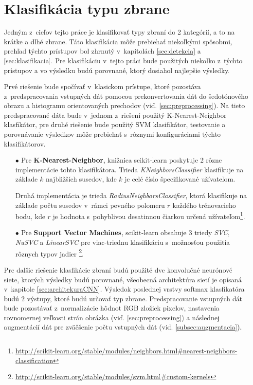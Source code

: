 
\section{Klasifikácia typu zbrane}
\label{sec:klasfikaciatypuzbrane}
Jedným z~cieľov tejto práce je klasifikovať typy zbraní do 2 kategórií, a to na krátke a dlhé zbrane.
Táto klasifikácia môže prebiehať niekoľkými spôsobmi, prehľad týchto prístupov bol zhrnutý v~kapitolách \ref{sec:detekcia} a \ref{sec:klasifikacia}.
Pre klasifikáciu v~tejto práci bude použitých niekoľko z~týchto prístupov a vo výsledku budú porovnané, ktorý dosiahol najlepšie výsledky.

Prvé riešenie bude spočívať v~klasickom prístupe, ktoré pozostáva z~predspracovania vstupných dát pomocou prekonvertovania dát do šedotónového obrazu a histogramu orientovaných prechodov (viď. \ref{sec:preprocessing}).
Na tieto predspracované dáta bude v~jednom z~riešení použitý K-Nearest-Neighbor klasfikátor, pre druhé riešenie bude použitý SVM klasifikátor, testovanie
    a porovnávanie výsledkov môže prebiehať s~rôznymi konfiguráciami týchto klasifikátorov.
\begin{enumerate}
    \item[$\bullet$] Pre \textbf{K-Nearest-Neighbor}, knižnica scikit-learn poskytuje 2 rôzne implementácie tohto klasifikátora.
    Trieda \textit{KNeighborsClassifier} klasifikuje na základe $k$ najbližších susedov, kde $k$ je celé číslo špecifikované užívateľom.
    
    Druhá implementácia je trieda \textit{RadiusNeighborsClassifier}, ktorá klasifikuje na základe počtu susedov v~rámci pevného polomeru $r$ každého trénovacieho bodu,
        kde $r$ je hodnota s~pohyblivou desatinnou čiarkou určená užívateľom\footnote{\url{http://scikit-learn.org/stable/modules/neighbors.html\#nearest-neighbors-classification}}.
    \item[$\bullet$] Pre \textbf{Support Vector Machines}, scikit-learn obsahuje 3 triedy \textit{SVC}, \textit{NuSVC} a \textit{LinearSVC} pre viac-triednu
        klasifikáciu s~možnosťou použitia rôznych typov jadier \footnote{\url{http://scikit-learn.org/stable/modules/svm.html\#custom-kernels}}.
\end{enumerate}

Pre dalšie riešenie klasfikácie zbraní budú použité dve konvolučné neurónové siete, ktorých výsledky budú porovnané, všeobecná architektúra sietí je opísaná v~kapitole \ref{sec:architekuraCNN}.
Výsledok poslednej vrstvy softmax klasfikatóra budú 2 výstupy, ktoré budú určovať typ zbrane.
Predspracovanie vstupných dát bude pozostávať z~normalizácie hôdnot RGB zložiek pixelov, nastavenia rovnomernej veľkosti strán obrázka (viď. \ref{sec:preprocessing})
    a následnej augmentácií dát pre zväčšenie počtu vstupných dát (viď. \ref{subsec:augmentacia}).
